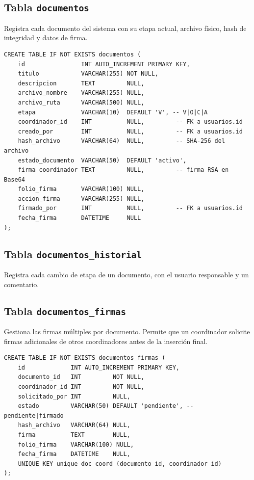 \documentclass[10pt,letterpaper]{report}
\begin{document}
\subsection{Tabla \texttt{documentos}}

Registra cada documento del sistema con su etapa actual, archivo físico, hash de integridad y datos de firma.

\begin{lstlisting}[style=sqlstyle, caption={Definición de la tabla documentos}]
CREATE TABLE IF NOT EXISTS documentos (
    id                INT AUTO_INCREMENT PRIMARY KEY,
    titulo            VARCHAR(255) NOT NULL,
    descripcion       TEXT         NULL,
    archivo_nombre    VARCHAR(255) NULL,
    archivo_ruta      VARCHAR(500) NULL,
    etapa             VARCHAR(10)  DEFAULT 'V', -- V|O|C|A
    coordinador_id    INT          NULL,         -- FK a usuarios.id
    creado_por        INT          NULL,         -- FK a usuarios.id
    hash_archivo      VARCHAR(64)  NULL,         -- SHA-256 del archivo
    estado_documento  VARCHAR(50)  DEFAULT 'activo',
    firma_coordinador TEXT         NULL,         -- firma RSA en Base64
    folio_firma       VARCHAR(100) NULL,
    accion_firma      VARCHAR(255) NULL,
    firmado_por       INT          NULL,         -- FK a usuarios.id
    fecha_firma       DATETIME     NULL
);
\end{lstlisting}

\subsection{Tabla \texttt{documentos\_historial}}

Registra cada cambio de etapa de un documento, con el usuario responsable y un comentario.

\subsection{Tabla \texttt{documentos\_firmas}}

Gestiona las firmas múltiples por documento. Permite que un coordinador solicite firmas adicionales de otros coordinadores antes de la inserción final.

\begin{lstlisting}[style=sqlstyle, caption={Definición de documentos\_firmas}]
CREATE TABLE IF NOT EXISTS documentos_firmas (
    id             INT AUTO_INCREMENT PRIMARY KEY,
    documento_id   INT         NOT NULL,
    coordinador_id INT         NOT NULL,
    solicitado_por INT         NULL,
    estado         VARCHAR(50) DEFAULT 'pendiente', -- pendiente|firmado
    hash_archivo   VARCHAR(64) NULL,
    firma          TEXT        NULL,
    folio_firma    VARCHAR(100) NULL,
    fecha_firma    DATETIME    NULL,
    UNIQUE KEY unique_doc_coord (documento_id, coordinador_id)
);
\end{lstlisting}
\end{document}
